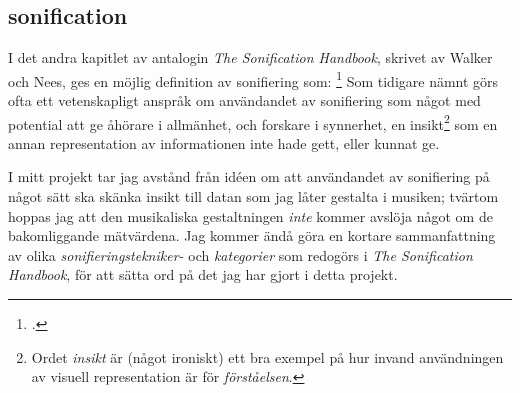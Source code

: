 \documentclass[11pt, a4paper]{article} %
\begin{document}




\subsection*{\gls{sonification}}

I det andra kapitlet av antalogin \emph{The Sonification Handbook}, skrivet av Walker och Nees, ges en möjlig definition av sonifiering som: 
\footcite[9]{hermann_theory_2011}
Som tidigare nämnt görs ofta ett vetenskapligt anspråk om användandet av sonifiering som något med potential att ge åhörare i allmänhet, och forskare i synnerhet, en insikt\footnote{Ordet \emph{insikt} är (något ironiskt) ett bra exempel på hur invand användningen av visuell representation är för \emph{förståelsen}.} som en annan representation av informationen inte hade gett, eller kunnat ge.  

I mitt projekt tar jag avstånd från idéen om att användandet av sonifiering på något sätt ska skänka insikt till datan som jag låter gestalta i musiken; tvärtom hoppas jag att den musikaliska gestaltningen \emph{inte} kommer avslöja något om de bakomliggande mätvärdena. Jag kommer ändå göra en kortare sammanfattning av olika \emph{sonifieringstekniker- } och \emph{kategorier} som redogörs i \emph{The Sonification Handbook}, för att sätta ord på det jag har gjort i detta projekt.%
\end{document}
